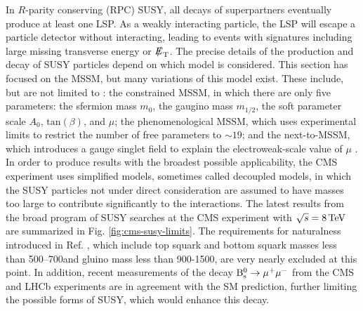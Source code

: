 \documentclass[12pt]{thesis}  %
\def\eslash{\ensuremath{{\hbox{$E$\kern-0.6em\lower-.05ex\hbox{/}\kern0.10em}}}}
\def\met{\mbox{$\eslash_\text{T}$}\xspace} %
\begin{document}
In $R$-parity conserving (RPC) SUSY, all decays of superpartners eventually produce at least one LSP. As a weakly interacting particle, the LSP will escape a particle detector without interacting, leading to events with signatures including large missing transverse energy or \met. The precise details of the production and decay of SUSY particles depend on which model is considered. This section has focused on the MSSM, but many variations of this model exist. These include, but are not limited to \cite{PDG}: the constrained MSSM, in which there are only five parameters: the sfermion mass $m_0$, the gaugino mass $m_{1/2}$, the soft parameter scale $A_{0}$, $\text{tan}(\beta)$, and $\mu$; the phenomenological MSSM, which uses experimental limits to restrict the number of free parameters to ${\sim}19$; and the next-to-MSSM, which introduces a gauge singlet field to explain the electroweak-scale value of $\mu$ \cite{NMSSM}. In order to produce results with the broadest possible applicability, the CMS experiment uses simplified models, sometimes called decoupled models, in which the SUSY particles not under direct consideration are assumed to have masses too large to contribute significantly to the interactions. The latest results from the broad program of SUSY searches at the CMS experiment with $\sqrt{s}=8\,\text{Te\hspace{-.08em}V}$ are summarized in Fig. \ref{fig:cms-susy-limits}. The requirements for naturalness introduced in Ref. \cite{NaturalSUSY}, which include top squark and bottom squark masses less than 500--700\GeV and gluino mass less than 900-1500\GeV, are very nearly excluded at this point. In addition, recent measurements of the decay $\mathrm{B}^{0}_{\mathrm{s}} \rightarrow \mu^{+} \mu^{-}$ from the CMS \cite{CMS-BSmumu} and LHCb \cite{LHCb-BSmumu} experiments are in agreement with the SM prediction, further limiting the possible forms of SUSY, which would enhance this decay.
\end{document}
